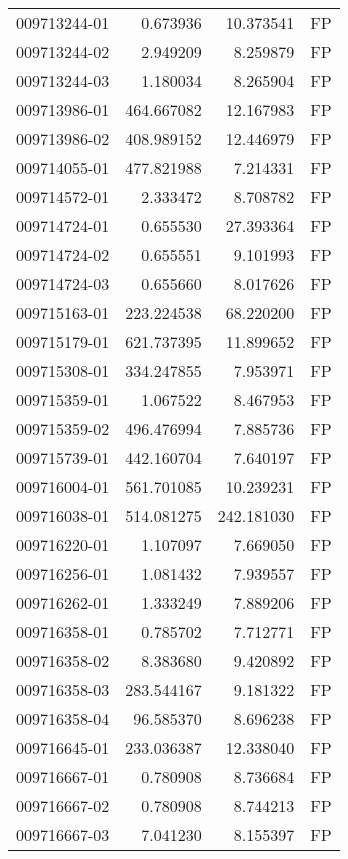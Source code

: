 \begin{tabular}{lrrl}
009713244-01 &    0.673936 &    10.373541 &   FP \\
009713244-02 &    2.949209 &     8.259879 &   FP \\
009713244-03 &    1.180034 &     8.265904 &   FP \\
009713986-01 &  464.667082 &    12.167983 &   FP \\
009713986-02 &  408.989152 &    12.446979 &   FP \\
009714055-01 &  477.821988 &     7.214331 &   FP \\
009714572-01 &    2.333472 &     8.708782 &   FP \\
009714724-01 &    0.655530 &    27.393364 &   FP \\
009714724-02 &    0.655551 &     9.101993 &   FP \\
009714724-03 &    0.655660 &     8.017626 &   FP \\
009715163-01 &  223.224538 &    68.220200 &   FP \\
009715179-01 &  621.737395 &    11.899652 &   FP \\
009715308-01 &  334.247855 &     7.953971 &   FP \\
009715359-01 &    1.067522 &     8.467953 &   FP \\
009715359-02 &  496.476994 &     7.885736 &   FP \\
009715739-01 &  442.160704 &     7.640197 &   FP \\
009716004-01 &  561.701085 &    10.239231 &   FP \\
009716038-01 &  514.081275 &   242.181030 &   FP \\
009716220-01 &    1.107097 &     7.669050 &   FP \\
009716256-01 &    1.081432 &     7.939557 &   FP \\
009716262-01 &    1.333249 &     7.889206 &   FP \\
009716358-01 &    0.785702 &     7.712771 &   FP \\
009716358-02 &    8.383680 &     9.420892 &   FP \\
009716358-03 &  283.544167 &     9.181322 &   FP \\
009716358-04 &   96.585370 &     8.696238 &   FP \\
009716645-01 &  233.036387 &    12.338040 &   FP \\
009716667-01 &    0.780908 &     8.736684 &   FP \\
009716667-02 &    0.780908 &     8.744213 &   FP \\
009716667-03 &    7.041230 &     8.155397 &   FP \\

\end{tabular}
